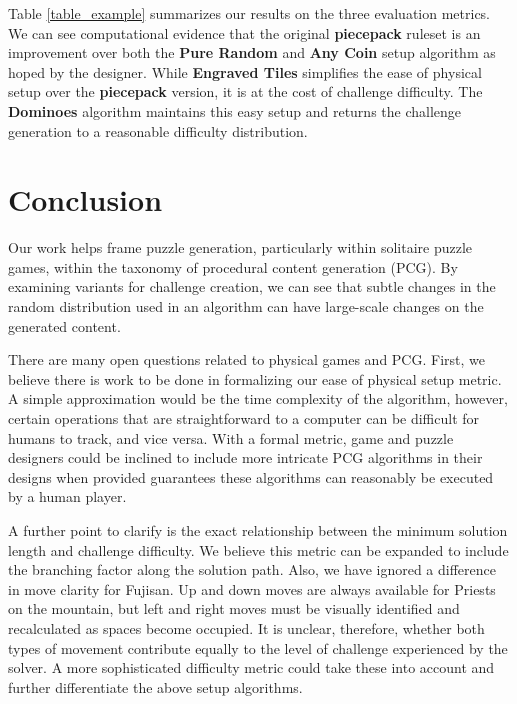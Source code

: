 \documentclass[10pt,journal,compsoc]{IEEEtran}
\begin{document}
Table \ref{table_example} summarizes our results on the three evaluation metrics. We can see computational evidence that the original {\bf piecepack} ruleset is an improvement over both the {\bf Pure Random} and {\bf Any Coin} setup algorithm as hoped by the designer. While {\bf Engraved Tiles} simplifies the ease of physical setup over the {\bf piecepack} version, it is at the cost of challenge difficulty. The {\bf Dominoes} algorithm maintains this easy setup and returns the challenge generation to a reasonable difficulty distribution.



\section{Conclusion}   \label{sec:Conclusion}

\noindent
Our work helps frame puzzle generation, particularly within solitaire puzzle games, within the taxonomy of procedural content generation (PCG). By examining variants for challenge creation, we can see that subtle changes in the random distribution used in an algorithm can have large-scale changes on the generated content.

There are many open questions related to physical games and PCG. First, we believe there is work to be done in formalizing our ease of physical setup metric. A simple approximation would be the time complexity of the algorithm, however, certain operations that are straightforward to a computer can be difficult for humans to track, and vice versa. With a formal metric, game and puzzle designers could be inclined to include more intricate PCG algorithms in their designs when provided guarantees these algorithms can reasonably be executed by a human player.

A further point to clarify is the exact relationship between the minimum solution length and challenge difficulty. We believe this metric can be expanded to include the branching factor along the solution path. Also, we have ignored a difference in move clarity for Fujisan. Up and down moves are always available for Priests on the mountain, but left and right moves must be visually identified and recalculated as spaces become occupied. It is unclear, therefore, whether both types of movement contribute equally to the level of challenge experienced by the solver. A more sophisticated difficulty metric could take these into account and further differentiate the above setup algorithms.
\end{document}

